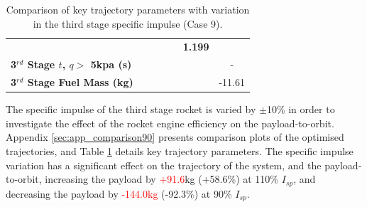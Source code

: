 \begin{table}[ht]
\begin{tabular}{l c c c c c c}
		& \textbf{\thirddExergyEffISPThreeNinetyFiveNoReturn}
		& \textbf{\thirddExergyEffISPThreeStandardNoReturn}
		& \textbf{\thirddExergyEffISPThreeOneHundredFiveNoReturn}
		& \textbf{\thirddExergyEffISPThreeOneHundredTenNoReturn}
		& \textbf{1.199}
		\\
		\textbf{3$^{rd}$ Stage $t$, $q >$ 5kpa (s)}
		& \thirdqOverFiveISPThreeNinetyNoReturn
		& \thirdqOverFiveISPThreeNinetyFiveNoReturn
		& \thirdqOverFiveISPThreeStandardNoReturn
		& \thirdqOverFiveISPThreeOneHundredFiveNoReturn
		& \thirdqOverFiveISPThreeOneHundredTenNoReturn
		& -
		\\
		\textbf{3$^{rd}$ Stage Fuel Mass (kg)}
		& \thirdmFuelISPThreeNinetyNoReturn
		& \thirdmFuelISPThreeNinetyFiveNoReturn
		& \thirdmFuelISPThreeStandardNoReturn
		& \thirdmFuelISPThreeOneHundredFiveNoReturn
		& \thirdmFuelISPThreeOneHundredTenNoReturn
		&-11.61
		\\
		\hline 
	\end{tabular} 
	\caption{Comparison of key trajectory parameters with variation in the third stage specific impulse (Case 9).}
	\label{tab:comparison90}
\end{table}

The specific impulse of the third stage rocket is varied by $\pm$10\% in order to investigate the effect of the rocket engine efficiency on the payload-to-orbit. Appendix \ref{sec:app_comparison90} presents comparison plots of the optimised trajectories, and Table \ref{tab:comparison90} details key trajectory parameters. 
The specific impulse variation has a significant effect on the trajectory of the system, and the payload-to-orbit, increasing the payload by \textcolor{red}{+91.6}kg (+58.6\%) at 110\% $I_{sp}$, and decreasing the payload by \textcolor{red}{-144.0kg} (-92.3\%) at 90\% $I_{sp}$. 

